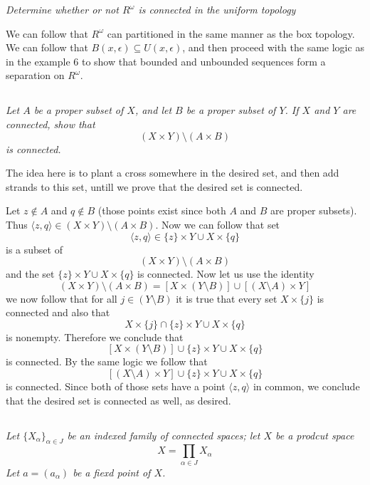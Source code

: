 \documentclass[11pt,oneside,titlepage]{book}
\newcommand{\eangle}[1]{\langle #1 \rangle}
\newcommand{\set}[1]{\{ #1 \}}
\begin{document}
\textit{Determine whether or not $R^\omega$ is connected in the uniform topology}

We can follow that $R^\omega$ can partitioned in the same manner as the box topology.
We can follow that $B(x, \epsilon) \subseteq U(x, \epsilon)$, and then proceed with the same
logic as in the example 6 to show that bounded and unbounded sequences form a separation on
$R^\omega$.

\subsection{}

\textit{Let $A$ be a proper subset of $X$, and let $B$ be a  proper subset of  $Y$. If $X$
  and $Y$ are connected, show that
  $$(X \times Y) \setminus (A \times B)$$
  is connected.}

The idea here is to plant a cross somewhere in the desired set, and then add
strands to this set, untill we prove that the desired set is connected.

Let  $z \notin A$ and $q \notin B$ (those points exist since both $A$ and $B$
are proper subsets).
Thus $\eangle{z, q} \in (X \times Y) \setminus (A \times B)$.
Now we can follow that set
$$\eangle{z, q} \in \set{z} \times Y \cup X \times \set{q}$$
is a subset of
$$(X \times Y) \setminus (A \times B)$$
and the set $\set{z} \times Y \cup X \times \set{q}$ is connected.
Now let us use the identity
$$(X \times Y) \setminus (A \times B) =  [X \times (Y \setminus B)] \cup
[(X \setminus A) \times Y]$$
we now follow that for all $j \in (Y \setminus B)$ it is true that
every set $X \times \set{j}$ is connected and also that 
$$X \times \set{j} \cap \set{z} \times Y \cup X \times \set{q}$$
is nonempty. Therefore we conclude that
$$[X \times (Y \setminus B)] \cup \set{z} \times Y \cup X \times \set{q}$$
is connected. By the same logic we follow that 
$$[(X \setminus A) \times Y] \cup \set{z} \times Y \cup X \times \set{q}$$
is connected. Since both of those sets have a point $\eangle{z, q}$ in common, we conclude that 
the desired set is connected as well, as desired.

\subsection{}

\textit{Let $\set{X_\alpha}_{\alpha \in J}$ be an indexed family of connected spaces; let $X$ be a
  prodcut space
  $$X = \prod_{\alpha \in J}{X_\alpha}$$
  Let $a = (a_\alpha)$ be a fiexd point of $X$.}
\end{document}
